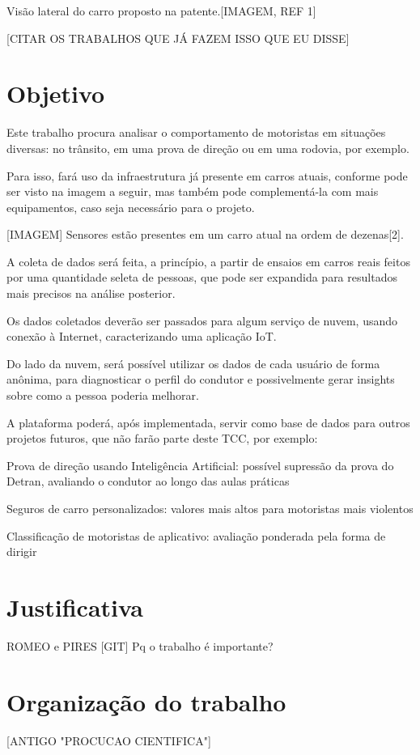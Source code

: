Visão lateral do carro proposto na patente.[IMAGEM, REF 1]

[CITAR OS TRABALHOS QUE JÁ FAZEM ISSO QUE EU DISSE]

\section{Objetivo}

Este trabalho procura analisar o comportamento de motoristas em situações diversas: no trânsito, em uma prova de direção ou em uma rodovia, por exemplo.

Para isso, fará uso da infraestrutura já presente em carros atuais, conforme pode ser visto na imagem a seguir, mas também pode complementá-la com mais equipamentos, caso seja necessário para o projeto.

[IMAGEM]
Sensores estão presentes em um carro atual na ordem de dezenas[2].

A coleta de dados será feita, a princípio, a partir de ensaios em carros reais feitos por uma quantidade seleta de pessoas, que pode ser expandida para resultados mais precisos na análise posterior.

Os dados coletados deverão ser passados para algum serviço de nuvem, usando conexão à Internet, caracterizando uma aplicação IoT.
	
Do lado da nuvem, será possível utilizar os dados de cada usuário de forma anônima, para diagnosticar o perfil do condutor e possivelmente gerar insights sobre como a pessoa poderia melhorar.
	
A plataforma poderá, após implementada, servir como base de dados para outros projetos futuros, que não farão parte deste TCC, por exemplo:

Prova de direção usando Inteligência Artificial: possível supressão da prova do Detran, avaliando o condutor ao longo das aulas práticas

Seguros de carro personalizados: valores mais altos para motoristas mais violentos

Classificação de motoristas de aplicativo: avaliação ponderada pela forma de dirigir

 
\section{Justificativa}
ROMEO e PIRES [GIT]
Pq o trabalho é importante?


\section{Organização do trabalho}
[ANTIGO "PROCUCAO CIENTIFICA"]

